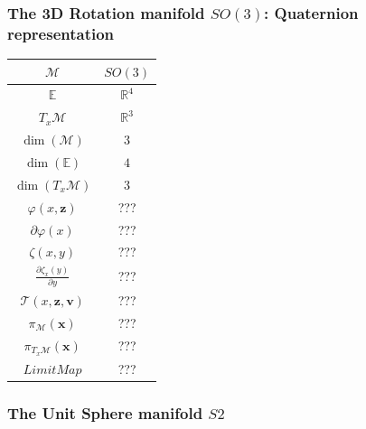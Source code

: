 \subsubsection{The 3D Rotation manifold $SO(3)$: Quaternion representation}
\label{ssub:the_3d_rotation_manifold_quaternion_representation}

\begin{table} [H]
\centering
\begin{tabular}{cc}
  \toprule
  $\mathcal{M}$ & $SO(3)$ \\
  \midrule
  $\mathbb{E}$ & $\mathbb{R}^{4}$ \\
  \midrule
  $T_x\mathcal{M}$ & $\mathbb{R}^3$ \\
  \midrule
  $\dim(\mathcal{M})$ & $3$ \\
  \midrule
  $\dim(\mathbb{E})$ & $4$ \\
  \midrule
  $\dim(T_x\mathcal{M})$ & $3$ \\
  \midrule
  $\varphi(x,\mathbf{z})$ & ??? \\
  \midrule
  $\partial \varphi(x)$ & ??? \\
  \midrule
  $\zeta(x,y)$ & ??? \\
  \midrule
  $\frac{\partial \zeta_x(y)}{\partial y}$ & ??? \\
  \midrule
  $\mathcal{T}(x,\mathbf{z}, \mathbf{v})$ & ??? \\
  \midrule
  $\pi_\mathcal{M}(\mathbf{x})$ & ??? \\
  \midrule
  $\pi_{T_x\mathcal{M}}(\mathbf{x})$ & ??? \\
  \midrule
  $Limit Map$ & ??? \\
  \bottomrule
\end{tabular}
\end{table}

\subsubsection{The Unit Sphere manifold $S2$}
\label{ssub:The Unit Sphere manifold S2}

